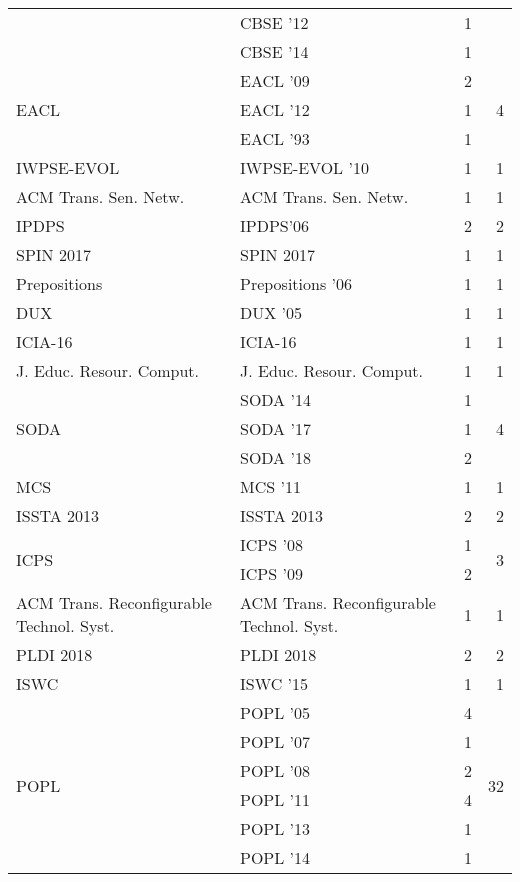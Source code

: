 \begin{table*}[t]
\begin{tabular}{llrr}
& CBSE '12 & 1 &\\
& CBSE '14 & 1 &\\
\multirow{3}{*}{EACL } & EACL '09 & 2 & \multirow{3}{*}{4}\\
& EACL '12 & 1 &\\
& EACL '93 & 1 &\\
\multirow{1}{*}{IWPSE-EVOL } & IWPSE-EVOL '10 & 1 & \multirow{1}{*}{1}\\
\multirow{1}{*}{ACM Trans. Sen. Netw.} & ACM Trans. Sen. Netw. & 1 & \multirow{1}{*}{1}\\
\multirow{1}{*}{IPDPS} & IPDPS'06 & 2 & \multirow{1}{*}{2}\\
\multirow{1}{*}{SPIN 2017} & SPIN 2017 & 1 & \multirow{1}{*}{1}\\
\multirow{1}{*}{Prepositions } & Prepositions '06 & 1 & \multirow{1}{*}{1}\\
\multirow{1}{*}{DUX } & DUX '05 & 1 & \multirow{1}{*}{1}\\
\multirow{1}{*}{ICIA-16} & ICIA-16 & 1 & \multirow{1}{*}{1}\\
\multirow{1}{*}{J. Educ. Resour. Comput.} & J. Educ. Resour. Comput. & 1 & \multirow{1}{*}{1}\\
\multirow{3}{*}{SODA } & SODA '14 & 1 & \multirow{3}{*}{4}\\
& SODA '17 & 1 &\\
& SODA '18 & 2 &\\
\multirow{1}{*}{MCS } & MCS '11 & 1 & \multirow{1}{*}{1}\\
\multirow{1}{*}{ISSTA 2013} & ISSTA 2013 & 2 & \multirow{1}{*}{2}\\
\multirow{2}{*}{ICPS } & ICPS '08 & 1 & \multirow{2}{*}{3}\\
& ICPS '09 & 2 &\\
\multirow{1}{*}{ACM Trans. Reconfigurable Technol. Syst.} & ACM Trans. Reconfigurable Technol. Syst. & 1 & \multirow{1}{*}{1}\\
\multirow{1}{*}{PLDI 2018} & PLDI 2018 & 2 & \multirow{1}{*}{2}\\
\multirow{1}{*}{ISWC } & ISWC '15 & 1 & \multirow{1}{*}{1}\\
\multirow{17}{*}{POPL } & POPL '05 & 4 & \multirow{17}{*}{32}\\
& POPL '07 & 1 &\\
& POPL '08 & 2 &\\
& POPL '11 & 4 &\\
& POPL '13 & 1 &\\
& POPL '14 & 1 &\\

\end{tabular}
\end{table*}
